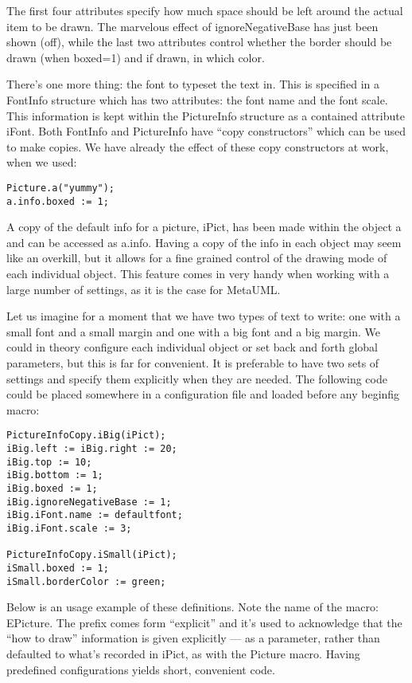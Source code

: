 \documentclass{article}
\newcommand{\code}{\ttfamily}
\newcommand{\metauml}{MetaUML}
\begin{document}
The first four attributes specify how much space should be left around the
actual item to be drawn. The marvelous effect of {\code ignoreNegativeBase}
has just been shown (off), while the last two attributes control whether the border
should be drawn (when {\code boxed=1}) and if drawn, in which color.

There's one more thing: the font to typeset the text in. This is specified
in a {\code FontInfo} structure which has two attributes: the font name
and the font scale. This information is kept within the {\code PictureInfo} structure
as a contained attribute {\code iFont}. Both {\code FontInfo} and {\code PictureInfo}
have ``copy constructors'' which can be used to make copies. We have already
the effect of these copy constructors at work, when we used:

\begin{verbatim}
Picture.a("yummy");
a.info.boxed := 1;
\end{verbatim}

A copy of the default info for a picture, {\code iPict}, has been made within
the object {\code a} and can be accessed as {\code a.info}. Having a copy of the
info in each object may seem like an overkill, but it allows for a fine grained
control of the drawing mode of each individual object. This feature comes in very
handy when working with a large number of settings, as it is the case for \metauml.

Let us imagine for a moment that we have two types of text to write: one with a small font
and a small margin and one with a big font and a big margin. We could in theory
configure each individual object or set back and forth global parameters, but
this is far for convenient. It is preferable to have two sets of settings and specify
them explicitly when they are needed. The following code could be placed somewhere
in a configuration file and loaded before any {\code beginfig} macro:
\begin{verbatim}
PictureInfoCopy.iBig(iPict);
iBig.left := iBig.right := 20;
iBig.top := 10;
iBig.bottom := 1;
iBig.boxed := 1;
iBig.ignoreNegativeBase := 1;
iBig.iFont.name := defaultfont;
iBig.iFont.scale := 3;

PictureInfoCopy.iSmall(iPict);
iSmall.boxed := 1;
iSmall.borderColor := green;
\end{verbatim}

Below is an usage example of these definitions. Note the name of the macro: {\code EPicture}.
The prefix comes form ``explicit''  and it's used to acknowledge that the
``how to draw'' information is given explicitly --- as a parameter,
rather than defaulted to what's recorded in {\code iPict}, as with the {\code Picture} macro.
Having predefined configurations yields short, convenient code.
\end{document}

